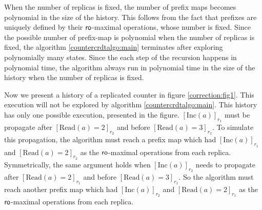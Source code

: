 When the number of replicas is fixed, the number of prefix maps becomes polynomial in the size of the history. This follows from the fact that prefixes are uniquely defined by their $\mathsf{ro}$-maximal operations, whose number is fixed. Since the possible number of prefix-map is polynomial when the number of replicas is fixed, the algorithm \ref{countercrdtalgo:main} terminates after exploring polynomially many states. Since the each step of the recursion happens in polynomial time, the algorithm always run in polynomial time in the size of the history when the number of replicas is fixed. 




Now we present a history of a replicated counter in figure \ref{correction:fig1}. This execution will not be explored by algorithm \ref{countercrdtalgo:main}. This history has only one possible execution, presented in the figure. $[\mathrm{Inc}(a)]_{r_1}$ must be propagate after $[\mathrm{Read}(a) = 2]_{r_2}$ and before $[\mathrm{Read}(a) = 3]_{r_2}$. To simulate this propagation, the algorithm must reach a prefix map which had $[\mathrm{Inc}(a)]_{r_1}$ and $[\mathrm{Read}(a) = 2]_{r_2}$ as the $\mathsf{ro}$-maximal operations from each replica. Symmetrically, the same argument holds when $[\mathrm{Inc}(a)]_{r_2}$ needs to propagate after $[\mathrm{Read}(a) = 2]_{r_1}$ and before $[\mathrm{Read}(a) = 3]_{r_1}$. So the algorithm must reach another prefix map which had $[\mathrm{Inc}(a)]_{r_2}$ and $[\mathrm{Read}(a) = 2]_{r_1}$ as the $\mathsf{ro}$-maximal operations from each replica. 


